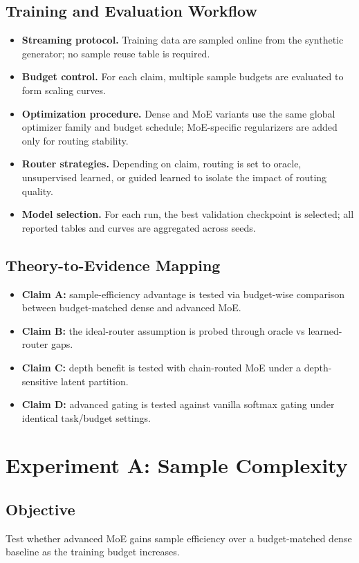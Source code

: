 \documentclass[11pt]{article}
\begin{document}
\subsection{Training and Evaluation Workflow}
\begin{itemize}
    \item \textbf{Streaming protocol.} Training data are sampled online from the synthetic generator; no sample reuse table is required.
    \item \textbf{Budget control.} For each claim, multiple sample budgets are evaluated to form scaling curves.
    \item \textbf{Optimization procedure.} Dense and MoE variants use the same global optimizer family and budget schedule; MoE-specific regularizers are added only for routing stability.
    \item \textbf{Router strategies.} Depending on claim, routing is set to oracle, unsupervised learned, or guided learned to isolate the impact of routing quality.
    \item \textbf{Model selection.} For each run, the best validation checkpoint is selected; all reported tables and curves are aggregated across seeds.
\end{itemize}

\subsection{Theory-to-Evidence Mapping}
\begin{itemize}
    \item \textbf{Claim A:} sample-efficiency advantage is tested via budget-wise comparison between budget-matched dense and advanced MoE.
    \item \textbf{Claim B:} the ideal-router assumption is probed through oracle vs learned-router gaps.
    \item \textbf{Claim C:} depth benefit is tested with chain-routed MoE under a depth-sensitive latent partition.
    \item \textbf{Claim D:} advanced gating is tested against vanilla softmax gating under identical task/budget settings.
\end{itemize}

\section{Experiment A: Sample Complexity}
\subsection{Objective}
Test whether advanced MoE gains sample efficiency over a budget-matched dense baseline as the training budget increases.
\end{document}

